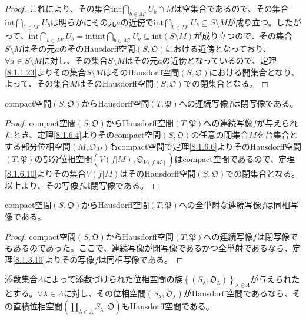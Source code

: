 \documentclass[dvipdfmx]{jsarticle}
\begin{document}
\begin{proof}
これにより、その集合${\mathrm{int}}{\bigcap_{b \in M'} U_{b}} \cap M$は空集合であるので、その集合${\mathrm{int}}{\bigcap_{b \in M'} U_{b}}$は明らかにその元$a$の近傍で${\mathrm{int}}{\bigcap_{b \in M'} U_{b}} \subseteq S \setminus M$が成り立つ。したがって、${\mathrm{int}}{\bigcap_{b \in M'} U_{b}} = {\mathrm{int}}{{\mathrm{int}}{\bigcap_{b \in M'} U_{b}}} \subseteq {\mathrm{int}}(S \setminus M)$が成り立つので、その集合$S \setminus M$はその元$a$のそのHausdorff空間$\left( S,\mathfrak{O} \right)$における近傍となっており、$\forall a \in S \setminus M$に対し、その集合$S \setminus M$はその元$a$の近傍となっているので、定理\ref{8.1.1.23}よりその集合$S \setminus M$はそのHausdorff空間$\left( S,\mathfrak{O} \right)$における開集合となり、よって、その集合$M$はそのHausdorff空間$\left( S,\mathfrak{O} \right)$での閉集合となる。
\end{proof}
\begin{thm}\label{8.1.6.11}
compact空間$\left( S,\mathfrak{O} \right)$からHausdorff空間$\left( T,\mathfrak{P} \right)$への連続写像$f$は閉写像である。
\end{thm}
\begin{proof}
compact空間$\left( S,\mathfrak{O} \right)$からHausdorff空間$\left( T,\mathfrak{P} \right)$への連続写像$f$が与えられたとき、定理\ref{8.1.6.4}よりそのcompact空間$\left( S,\mathfrak{O} \right)$の任意の閉集合$M$を台集合とする部分位相空間$\left( M,\mathfrak{O}_{M} \right)$もcompact空間で定理\ref{8.1.6.6}よりそのHausdorff空間$\left( T,\mathfrak{P} \right)$の部分位相空間$\left( V\left( f|M \right),\mathfrak{O}_{V\left( f|M \right)} \right)$はcompact空間であるので、定理\ref{8.1.6.10}よりその集合$V\left( f|M \right)$はそのHausdorff空間$\left( S,\mathfrak{O} \right)$での閉集合となる。以上より、その写像$f$は閉写像である。
\end{proof}
\begin{thm}\label{8.1.6.12}
compact空間$\left( S,\mathfrak{O} \right)$からHausdorff空間$\left( T,\mathfrak{P} \right)$への全単射な連続写像$f$は同相写像である。
\end{thm}
\begin{proof}
compact空間$\left( S,\mathfrak{O} \right)$からHausdorff空間$\left( T,\mathfrak{P} \right)$への連続写像$f$は閉写像でもあるのであった。ここで、連続写像が閉写像であるかつ全単射であるなら、定理\ref{8.1.3.10}よりその写像$f$は同相写像である。
\end{proof}
\begin{thm}\label{8.1.6.13}
添数集合$\varLambda$によって添数づけられた位相空間の族$\left\{ \left( S_{\lambda},\mathfrak{O}_{\lambda} \right) \right\}_{\lambda \in \varLambda}$が与えられたとする。$\forall\lambda \in \varLambda$に対し、その位相空間$\left( S_{\lambda},\mathfrak{O}_{\lambda} \right)$がHausdorff空間であるなら、その直積位相空間$\left( \prod_{\lambda \in \varLambda} S_{\lambda},\mathfrak{O} \right)$もHausdorff空間である。
\end{thm}
\end{document}
